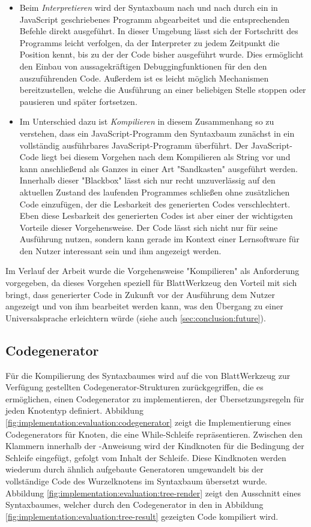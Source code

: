 \begin{itemize}
  \item Beim \emph{Interpretieren} wird der Syntaxbaum nach und nach durch ein in JavaScript geschriebenes Programm abgearbeitet und die entsprechenden Befehle direkt ausgeführt. In dieser Umgebung lässt sich der Fortschritt des Programms leicht verfolgen, da der Interpreter zu jedem Zeitpunkt die Position kennt, bis zu der der Code bisher ausgeführt wurde. Dies ermöglicht den Einbau von aussagekräftigen Debuggingfunktionen für den den auszuführenden Code. Außerdem ist es leicht möglich Mechanismen bereitzustellen, welche die Ausführung an einer beliebigen Stelle stoppen oder pausieren und später fortsetzen.
  \item Im Unterschied dazu ist \emph{Kompilieren} in diesem Zusammenhang so zu verstehen, dass ein JavaScript-Programm den Syntaxbaum zunächst in ein vollständig ausführbares JavaScript-Programm überführt. Der JavaScript-Code liegt bei diesem Vorgehen nach dem Kompilieren als String vor und kann anschließend als Ganzes in einer Art "Sandkasten" ausgeführt werden. Innerhalb dieser "Blackbox" lässt sich nur recht unzuverlässig auf den aktuellen Zustand des laufenden Programmes schließen ohne zusätzlichen Code einzufügen, der die Lesbarkeit des generierten Codes verschlechtert. Eben diese Lesbarkeit des generierten Codes ist aber einer der wichtigsten Vorteile dieser Vorgehensweise. Der Code lässt sich nicht nur für seine Ausführung nutzen, sondern kann gerade im Kontext einer Lernsoftware für den Nutzer interessant sein und ihm angezeigt werden.
\end{itemize}

Im Verlauf der Arbeit wurde die Vorgehensweise "Kompilieren" als Anforderung vorgegeben, da dieses Vorgehen speziell für BlattWerkzeug den Vorteil mit sich bringt, dass generierter Code in Zukunft vor der Ausführung dem Nutzer angezeigt und von ihm bearbeitet werden kann, was den Übergang zu einer Universalsprache erleichtern würde (siehe auch \ref{sec:conclusion:future}).

\subsection{Codegenerator}
\label{sec:implementation:evaluation:codegenerator}

Für die Kompilierung des Syntaxbaumes wird auf die von BlattWerkzeug zur Verfügung gestellten Codegenerator-Strukturen zurückgegriffen, die es ermöglichen, einen Codegenerator zu implementieren, der Übersetzungsregeln für jeden Knotentyp definiert. Abbildung \ref{fig:implementation:evaluation:codegenerator} zeigt die Implementierung eines Codegenerators für Knoten, die eine While-Schleife repräsentieren. Zwischen den Klammern innerhalb der -Anweisung wird der Kindknoten für die Bedingung der Schleife eingefügt, gefolgt vom Inhalt der Schleife. Diese Kindknoten werden wiederum durch ähnlich aufgebaute Generatoren umgewandelt bis der vollständige Code des Wurzelknotens im Syntaxbaum übersetzt wurde. Abbildung \ref{fig:implementation:evaluation:tree-render} zeigt den Ausschnitt eines Syntaxbaumes, welcher durch den Codegenerator in den in Abbildung \ref{fig:implementation:evaluation:tree-result} gezeigten Code kompiliert wird.

